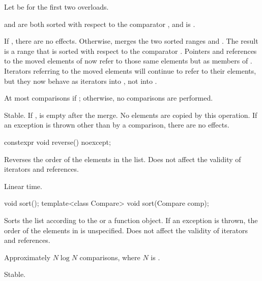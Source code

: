 \begin{itemdescr}
\pnum
Let  be  for the first two overloads.

\pnum
\expects
{} and  are both sorted
with respect to the comparator , and
 is .

\pnum
\effects
If , there are no effects.
Otherwise, merges
the two sorted ranges  and .
The result is a range
that is sorted with respect to the comparator .
Pointers and references to the moved elements of  now refer to those same elements
but as members of . Iterators referring to the moved elements will continue to
refer to their elements, but they now behave as iterators into , not into
.

\pnum
\complexity
At most  comparisons
if ;
otherwise, no comparisons are performed.

\pnum
\remarks
Stable.
If ,  is empty after the merge.
No elements are copied by this operation.
If an exception is thrown other than by a comparison, there are no effects.
\end{itemdescr}

%
\begin{itemdecl}
constexpr void reverse() noexcept;
\end{itemdecl}

\begin{itemdescr}
\pnum
\effects
Reverses the order of the elements in the list.
Does not affect the validity of iterators and references.

\pnum
\complexity
Linear time.
\end{itemdescr}

%
\begin{itemdecl}
void sort();
template<class Compare> void sort(Compare comp);
\end{itemdecl}

\begin{itemdescr}
\pnum
\effects
Sorts the list according to the  or a  function object.
If an exception is thrown,
the order of the elements in  is unspecified.
Does not affect the validity of iterators and references.

\pnum
\complexity
Approximately
$N \log N$
comparisons, where $N$ is .

\pnum
\remarks
Stable.
\end{itemdescr}

